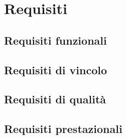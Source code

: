 \section{Requisiti}
\subsection{Requisiti funzionali}
\subsection{Requisiti di vincolo}
\subsection{Requisiti di qualità}
\subsection{Requisiti prestazionali}
